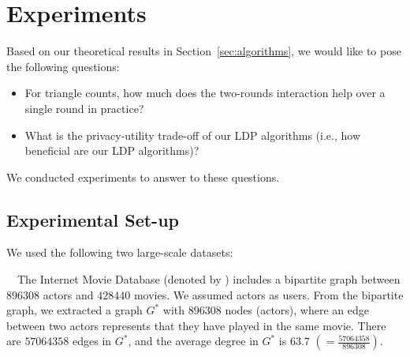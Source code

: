 \section{Experiments}
\label{sec:experiments}

Based on our theoretical results in Section~\ref{sec:algorithms}, we would like to pose the following questions:
\begin{itemize}
    \item For triangle counts, how much does the two-rounds interaction help over a single round in practice?
    \item What is the privacy-utility trade-off 
    of our LDP algorithms 
    (i.e., how beneficial are our LDP algorithms)?
\end{itemize}
We conducted experiments to answer to these questions. 

\subsection{Experimental Set-up}
\label{sub:setup}
We used the following two large-scale datasets:

\smallskip
~~The Internet Movie Database (denoted by \IMDB{}) 
\cite{IMDB_GD05} 
includes a bipartite graph between $896308$ actors and $428440$ movies. 
We assumed actors as users. 
From the bipartite graph, we extracted 
a graph $G^*$ with $896308$ nodes (actors), where an edge between two actors represents that they have played in the same movie. 
There are $57064358$ edges in $G^*$, and the average degree in $G^*$ is $63.7$ $(=\frac{57064358}{896308})$.

